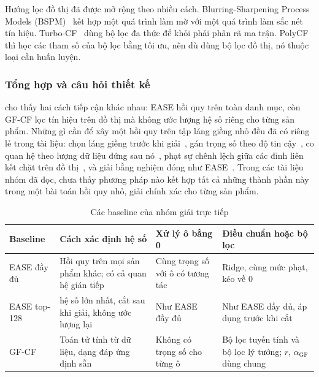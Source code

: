Hướng lọc đồ thị đã được mở rộng theo nhiều cách. Blurring-Sharpening Process Models (BSPM)~\cite{choi2023bspm} kết hợp một quá trình làm mờ với một quá trình làm sắc nét tín hiệu. Turbo-CF~\cite{park2024turbocf} dùng bộ lọc đa thức để khỏi phải phân rã ma trận. PolyCF~\cite{qin2025polycf} thì học các tham số của bộ lọc bằng tối ưu, nên dù dùng bộ lọc đồ thị, nó thuộc loại cần huấn luyện.

\subsubsection{Tổng hợp và câu hỏi thiết kế}
\label{sec:closed-form-gap}

 cho thấy hai cách tiếp cận khác nhau: EASE hồi quy trên toàn danh mục, còn GF-CF lọc tín hiệu trên đồ thị mà không ước lượng hệ số riêng cho từng sản phẩm. Những gì cần để xây một hồi quy trên tập láng giềng nhỏ đều đã có riêng lẻ trong tài liệu: chọn láng giềng trước khi giải~\cite{sarwar2001itembased,ning2011slim}, gán trọng số theo độ tin cậy~\cite{hu2008wmf}, co quan hệ theo lượng dữ liệu đứng sau nó~\cite{koren2008factorization}, phạt sự chênh lệch giữa các đỉnh liên kết chặt trên đồ thị~\cite{shuman2013graph}, và giải bằng nghiệm đóng như EASE~\cite{steck2019ease}. Trong các tài liệu nhóm đã đọc, chưa thấy phương pháp nào kết hợp tất cả những thành phần này trong một bài toán hồi quy nhỏ, giải chính xác cho từng sản phẩm.

\begin{table}[H]
\centering
\small
\renewcommand{\arraystretch}{1.1}
\begin{tabularx}{\textwidth}{@{}p{2.4cm}>{\raggedright\arraybackslash}X>{\raggedright\arraybackslash}X>{\raggedright\arraybackslash}X@{}}
\toprule
Baseline & Cách xác định hệ số & Xử lý ô bằng 0 & Điều chuẩn hoặc bộ lọc \\
\midrule
EASE đầy đủ & Hồi quy trên mọi sản phẩm khác; có cả quan hệ gián tiếp & Cùng trọng số với ô có tương tác & Ridge, cùng mức phạt, kéo về 0 \\
EASE top-128 & 128 hệ số lớn nhất, cắt sau khi giải, không ước lượng lại & Như EASE đầy đủ & Như EASE đầy đủ, áp dụng trước khi cắt \\
GF-CF & Toán tử tính từ dữ liệu, dạng đáp ứng định sẵn & Không có trọng số cho từng ô & Bộ lọc tuyến tính và bộ lọc lý tưởng; $r$, $\alpha_{\mathrm{GF}}$ dùng chung \\
\bottomrule
\end{tabularx}
\caption{Các baseline của nhóm giải trực tiếp}
\label{tab:closed-form-family}
\end{table}


